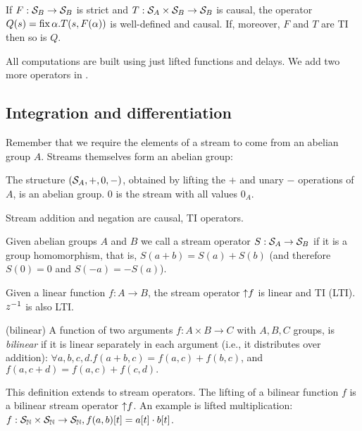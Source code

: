 \begin{lemma}\label{feedback-semantics}
\label{cor-loop}
If $F: \mathcal{S}_{B} \to \mathcal{S}_{B}$ is strict and $T: \mathcal{S}_{A} \times \mathcal{S}_{B} \to \mathcal{S}_{B}$ is causal,
the operator $Q(s)=\mbox{fix}\,\alpha.T(s,F(\alpha))$ is well-defined and causal.
If, moreover, $F$ and $T$ are TI then so is $Q$.
\end{lemma}

All \dbsp computations are built using just lifted functions and
delays.  We add two more operators in .

\subsection{Integration and differentiation}\label{sec:abelianstreams}

Remember that we require the elements of a stream to come from an abelian group $A$.
Streams themselves form an abelian group:

\begin{proposition}
The structure $(\mathcal{S}_{A},+,0,-)$, obtained by lifting the $+$ and unary $-$ operations of $A$,
is an abelian group.  0 is the stream with all values $0_A$.
\end{proposition}

\noindent
Stream addition and negation are causal, TI operators.

\begin{definition}
Given abelian groups $A$ and $B$ we call a stream operator
$S: \mathcal{S}_{A} \rightarrow \mathcal{S}_{B}$  if it is a group homomorphism, that is,
$S(a+b)=S(a)+S(b)$ (and therefore $S(0)=0$ and $S(-a)=-S(a)$).
\end{definition}

Given a linear function $f: A \to B$, the stream operator ${\uparrow}f$
is linear and TI (LTI).  $z^{-1}$ is also LTI.

\begin{definition}(bilinear)
A function of two arguments $f: A \times B \to C$ with $A, B, C$ groups, is \emph{bilinear}
if it is linear separately in each argument (i.e., it distributes over addition):
$\forall a, b, c, d . f(a+b, c) = f(a, c) + f(b, c)$, and $f(a, c+d) = f(a, c) + f(c, d).$
\end{definition}

This definition extends to stream operators.
The lifting of a bilinear function $f$ is
a bilinear stream operator ${\uparrow}f$.  An example
is lifted multiplication:
$f: \mathcal{S}_{\mathbb{N}} \times \mathcal{S}_{\mathbb{N}} \to \mathcal{S}_{\mathbb{N}}, f(a, b)[t] = a[t]\cdot b[t]$.


